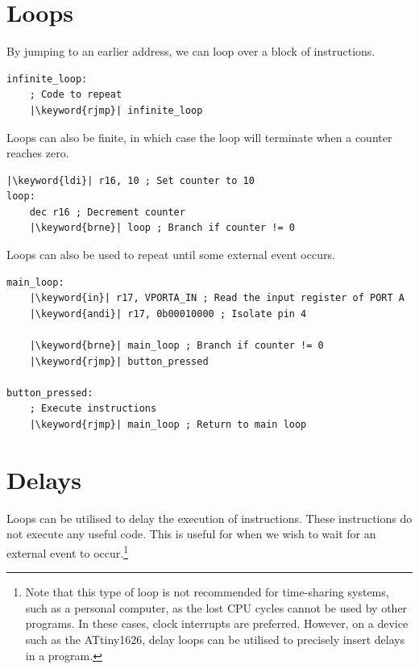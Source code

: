 \documentclass[a4paper]{report}
\newcommand{\keyword}[1]{\textcolor[rgb]{0.00,0.50,0.00}{\textbf{#1}}}
\begin{document}
\section{Loops}
By jumping to an earlier address, we can loop over a block of instructions.
\begin{verbatim}
infinite_loop:
    ; Code to repeat
    |\keyword{rjmp}| infinite_loop
\end{verbatim}
Loops can also be finite, in which case the loop will terminate when a counter reaches zero.
\begin{verbatim}
|\keyword{ldi}| r16, 10 ; Set counter to 10
loop:
    dec r16 ; Decrement counter
    |\keyword{brne}| loop ; Branch if counter != 0
\end{verbatim}
Loops can also be used to repeat until some external event occurs.
\begin{verbatim}
main_loop:
    |\keyword{in}| r17, VPORTA_IN ; Read the input register of PORT A
    |\keyword{andi}| r17, 0b00010000 ; Isolate pin 4

    |\keyword{brne}| main_loop ; Branch if counter != 0
    |\keyword{rjmp}| button_pressed

button_pressed:
    ; Execute instructions
    |\keyword{rjmp}| main_loop ; Return to main loop
\end{verbatim}
\section{Delays}
Loops can be utilised to delay the execution of instructions. These instructions do
not execute any useful code. This is useful for when we wish to wait for an external event to occur.\footnote{Note that this type of loop is not recommended for time-sharing systems, such as a personal computer, as the lost CPU cycles cannot be used by other programs. In these cases, clock interrupts are preferred. However, on a device such as the ATtiny1626, delay loops can be utilised to precisely insert delays in a program.}
\end{document}
